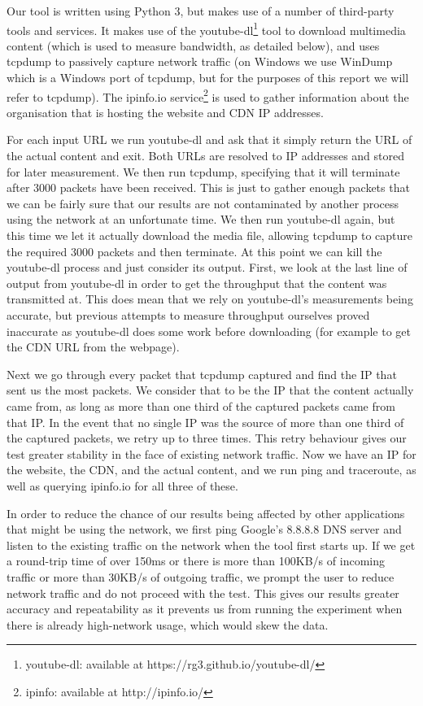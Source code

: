 \documentclass{sig-alternate-05-2015}
\begin{document}
Our tool is written using Python 3, but makes use of a number of third-party tools and services. It makes use of the youtube-dl\footnote{youtube-dl: available at https://rg3.github.io/youtube-dl/} tool to download multimedia content (which is used to measure bandwidth, as detailed below), and uses tcpdump to passively capture network traffic (on Windows we use WinDump which is a Windows port of tcpdump, but for the purposes of this report we will refer to tcpdump). The ipinfo.io service\footnote{ipinfo: available at http://ipinfo.io/} is used to gather information about the organisation that is hosting the website and CDN IP addresses.

For each input URL we run youtube-dl and ask that it simply return the URL of the actual content and exit. Both URLs are resolved to IP addresses and stored for later measurement. We then run tcpdump, specifying that it will terminate after 3000 packets have been received. This is just to gather enough packets that we can be fairly sure that our results are not contaminated by another process using the network at an unfortunate time. We then run youtube-dl again, but this time we let it actually download the media file, allowing tcpdump to capture the required 3000 packets and then terminate. At this point we can kill the youtube-dl process and just consider its output. First, we look at the last line of output from youtube-dl in order to get the throughput that the content was transmitted at. This does mean that we rely on youtube-dl's measurements being accurate, but previous attempts to measure throughput ourselves proved inaccurate as youtube-dl does some work before downloading (for example to get the CDN URL from the webpage).

Next we go through every packet that tcpdump captured and find the IP that sent us the most packets. We consider that to be the IP that the content actually came from, as long as more than one third of the captured packets came from that IP. In the event that no single IP was the source of more than one third of the captured packets, we retry up to three times. This retry behaviour gives our test greater stability in the face of existing network traffic. Now we have an IP for the website, the CDN, and the actual content, and we run ping and traceroute, as well as querying ipinfo.io for all three of these.

In order to reduce the chance of our results being affected by other applications that might be using the network, we first ping Google's 8.8.8.8 DNS server and listen to the existing traffic on the network when the tool first starts up. If we get a round-trip time of over 150ms or there is more than 100KB/s of incoming traffic or more than 30KB/s of outgoing traffic, we prompt the user to reduce network traffic and do not proceed with the test. This gives our results greater accuracy and repeatability as it prevents us from running the experiment when there is already high-network usage, which would skew the data.
\end{document}
